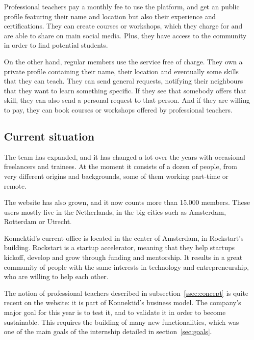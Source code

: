 Professional teachers pay a monthly fee to use the platform, and get an public profile featuring their name and location but also their experience and certifications.
They can create courses or workshops, which they charge for and are able to share on main social media.
Plus, they have access to the community in order to find potential students.

On the other hand, regular members use the service free of charge. They own a private profile containing their name, their location and eventually some skills that they can teach.
They can send general requests, notifying their neighbours that they want to learn something specific.
If they see that somebody offers that skill, they can also send a personal request to that person.
And if they are willing to pay, they can book courses or workshops offered by professional teachers.

\subsection{Current situation}
\label{ssec:situation}

The team has expanded, and it has changed a lot over the years with occasional freelancers and trainees.
At the moment it consists of a dozen of people, from very different origins and backgrounds, some of them working part-time or remote.

The website has also grown, and it now counts more than 15.000 members.
These users mostly live in the Netherlands, in the big cities such as Amsterdam, Rotterdam or Utrecht.

Konnektid's current office is located in the center of Amsterdam, in Rockstart's building.
Rockstart is a startup accelerator, meaning that they help startups kickoff, develop and grow through funding and mentorship.
It results in a great community of people with the same interests in technology and entrepreneurship, who are willing to help each other.

The notion of professional teachers described in {\sc subsection}~\ref{ssec:concept} is quite recent on the website: it is part of Konnektid's business model.
The company's major goal for this year is to test it, and to validate it in order to become sustainable.
This requires the building of many new functionalities, which was one of the main goals of the internship detailed in {\sc section}~\ref{sec:goals}.
